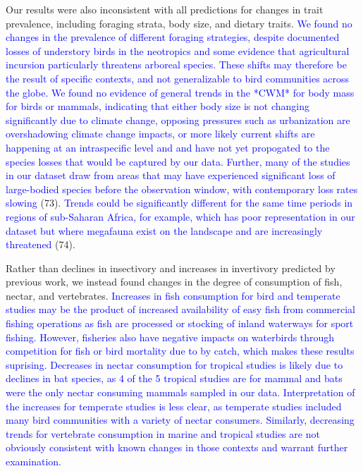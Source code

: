 \documentclass{article}
\begin{document}
Our results were also inconsistent with all predictions for changes in
trait prevalence, including foraging strata, body size, and dietary
traits.
\textcolor{blue}{We found no changes in the prevalence of different foraging strategies, despite documented losses of understory birds in the neotropics and some evidence that agricultural incursion particularly threatens arboreal species. These shifts may therefore be the result of specific contexts, and not generalizable to bird communities across the globe. We found no evidence of general trends in the *CWM* for body mass for birds or mammals, indicating that either body size is not changing significantly due to climate change, opposing pressures such as urbanization are overshadowing climate change impacts, or more likely current shifts are happening at an intraspecific level and and have not yet propogated to the species losses that would be captured by our data. Further, many of the studies in our dataset draw from areas that may have experienced significant loss of large-bodied species before the observation window, with contemporary loss rates slowing}
(73).
\textcolor{blue}{Trends could be significantly different for the same time periods in regions of sub-Saharan Africa, for example, which has poor representation in our dataset but where megafauna exist on the landscape and are increasingly threatened}
(74).

Rather than declines in insectivory and increases in invertivory
predicted by previous work, we instead found changes in the degree of
consumption of fish, nectar, and vertebrates.
\textcolor{blue}{Increases in fish consumption for bird and temperate studies may be the product of increased availability of easy fish from commercial fishing operations as fish are processed or stocking of inland waterways for sport fishing. However, fisheries also have negative impacts on waterbirds through competition for fish or bird mortality due to by catch, which makes these results suprising. Decreases in nectar consumption for tropical studies is likely due to declines in bat species, as 4 of the 5 tropical studies are for mammal and bats were the only nectar consuming mammals sampled in our data. Interpretation of the increases for temperate studies is less clear, as temperate studies included many bird communities with a variety of nectar consumers. Similarly, decreasing trends for vertebrate consumption in marine and tropical studies are not obviously consistent with known changes in those contexts and warrant further examination.}
\end{document}
